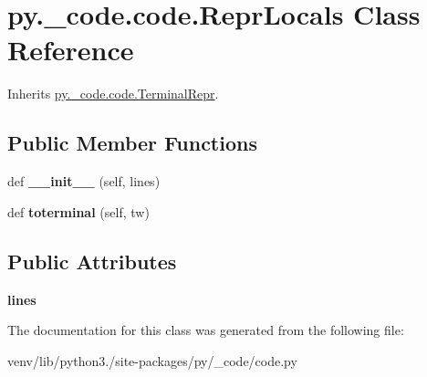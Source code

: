 \hypertarget{classpy_1_1__code_1_1code_1_1_repr_locals}{}\section{py.\+\_\+code.\+code.\+Repr\+Locals Class Reference}
\label{classpy_1_1__code_1_1code_1_1_repr_locals}


Inherits \hyperlink{classpy_1_1__code_1_1code_1_1_terminal_repr}{py.\+\_\+code.\+code.\+Terminal\+Repr}.

\subsection*{Public Member Functions}
\begin{DoxyCompactItemize}
\item 
\mbox{\label{classpy_1_1__code_1_1code_1_1_repr_locals_ab45ad4f949017fe6a290cadcf719baf3}} 
def {\bfseries \+\_\+\+\_\+init\+\_\+\+\_\+} (self, lines)
\item 
\mbox{\label{classpy_1_1__code_1_1code_1_1_repr_locals_af4601f86d09df37accc71be9a5b28383}} 
def {\bfseries toterminal} (self, tw)
\end{DoxyCompactItemize}
\subsection*{Public Attributes}
\begin{DoxyCompactItemize}
\item 
\mbox{\label{classpy_1_1__code_1_1code_1_1_repr_locals_a9ab09cb68ddf1a6dd36031590f8f0b71}} 
{\bfseries lines}
\end{DoxyCompactItemize}


The documentation for this class was generated from the following file\+:\begin{DoxyCompactItemize}
\item 
venv/lib/python3./site-\/packages/py/\+\_\+code/code.\+py\end{DoxyCompactItemize}
